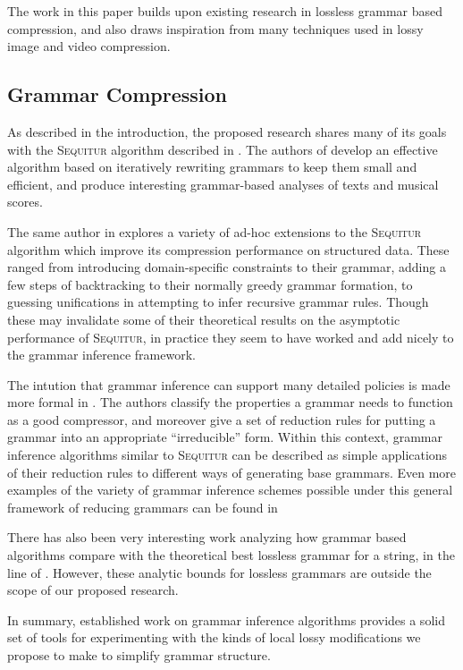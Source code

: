 \documentclass[11pt]{article}
\newcommand{\Sequitur}{\textsc{Sequitur}\xspace}
\begin{document}
The work in this paper builds upon existing research in lossless grammar based
compression, and also draws inspiration from many techniques used in lossy
image and video compression.

\subsection{Grammar Compression}

As described in the introduction, the proposed research shares many of its
goals with the \Sequitur algorithm described in \cite{sequitur}.  The authors
of \cite{sequitur} develop an effective algorithm based on iteratively
rewriting grammars to keep them small and efficient, and produce interesting
grammar-based analyses of texts and musical scores.

The same author in \cite{nevillphd} explores a variety of ad-hoc extensions to
the \Sequitur algorithm which improve its compression performance on structured
data.  These ranged from introducing domain-specific constraints to their
grammar, adding a few steps of backtracking to their normally greedy grammar
formation, to guessing unifications in attempting to infer recursive grammar
rules.  Though these may invalidate some of their theoretical results on the
asymptotic performance of \Sequitur, in practice they seem to have worked and
add nicely to the grammar inference framework.

The intution that grammar inference can support many detailed policies is made
more formal in \cite{grammarcodes}.  The authors classify the properties a
grammar needs to function as a good compressor, and moreover give a set of
reduction rules for putting a grammar into an appropriate ``irreducible'' form.
Within this context, grammar inference algorithms similar to \Sequitur can be
described as simple applications of their reduction rules to different ways of
generating base grammars.  Even more examples of the variety of grammar
inference schemes possible under this general framework of reducing grammars
can be found in \cite{efficientgreedy}

There has also been very interesting work analyzing how grammar based
algorithms compare with the theoretical best lossless grammar for a string, in
the line of \cite{approximation}.  However, these analytic bounds for lossless
grammars are outside the scope of our proposed research.

In summary, established work on grammar inference algorithms provides a solid
set of tools for experimenting with the kinds of local lossy modifications we
propose to make to simplify grammar structure.
\end{document}

